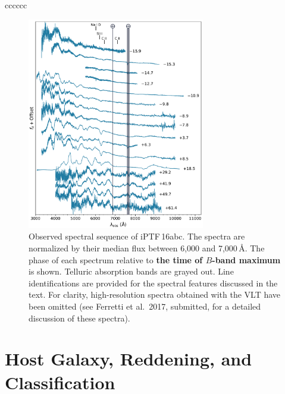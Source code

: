 \documentclass[twocolumn]{aastex61}
\newcommand{\abc}{iPTF\,16abc}
\begin{document}
\begin{deluxetable}{cccccc}
  \enddata
\end{deluxetable}

\begin{figure}[!htb]
  \centering
  \includegraphics[width=0.69\textwidth]{spectra.pdf}
  \caption{Observed spectral sequence of \abc. The spectra are 
  normalized by their median flux between 6,000 and 
  7,000$\,\textrm{\AA}$.  The phase of each spectrum 
  relative to \textbf{the time of $B$-band maximum} is shown. Telluric absorption
  bands are grayed out. Line identifications are provided for 
  the spectral features discussed in the text. 
  For clarity, high-resolution spectra obtained with the VLT have been omitted (see Ferretti et al.\ 2017, submitted, for a detailed discussion of these spectra).}
  \label{fig:spec_seq}
\end{figure}

\section{Host Galaxy, Reddening, and Classification}
\label{sec:usual_staff}
\end{document}
